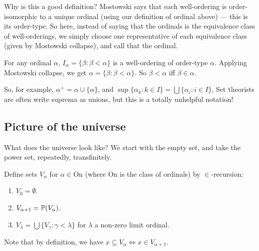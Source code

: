 \documentclass[a4paper]{article}
\begin{document}
Why is this a good definition? Mostowski says that each well-ordering is order-isomorphic to a unique ordinal (using our definition of ordinal above) --- this is its order-type. So here, instead of saying that the ordinals is the equivalence class of well-orderings, we simply choose one representative of each equivalence class (given by Mostowski collapse), and call that the ordinal.

For any ordinal $\alpha$, $I_\alpha = \{\beta: \beta < \alpha \}$ is a well-ordering of order-type $\alpha$. Applying Mostowski collapse, we get $\alpha = \{\beta: \beta < \alpha\}$. So $\beta < \alpha$ iff $\beta \in \alpha$.

So, for example, $\alpha^+ = \alpha \cup \{\alpha\}$, and $\sup \{\alpha_k: k\in I\} = \bigcup\{\alpha_i: i\in I\}$, Set theorists are often write suprema as unions, but this is a totally unhelpful notation!

\subsection{Picture of the universe}
What does the universe look like? We start with the empty set, and take the power set, repeatedly, transfinitely.

\begin{defi}
  Define sets $V_\alpha$ for $\alpha \in \mathrm{On}$ (where $\mathrm{On}$ is the class of ordinals) by $\in$-recursion:
  \begin{enumerate}
    \item $V_0 = \emptyset$.
    \item $V_{\alpha + 1} = \P(V_\alpha)$.
    \item $V_\lambda = \bigcup\{V_\gamma: \gamma < \lambda\}$ for $\lambda$ a non-zero limit ordinal.
  \end{enumerate}
\end{defi}
\begin{center}
\end{center}
Note that by definition, we have $x\subseteq V_\alpha \Leftrightarrow x\in V_{\alpha + 1}$.
\end{document}
